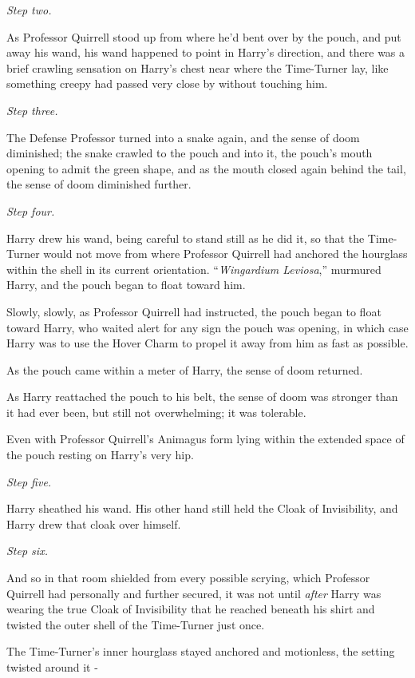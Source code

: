 \emph{Step two.}

As Professor Quirrell stood up from where he'd bent over by the pouch, and put away his wand, his wand happened to point in Harry's direction, and there was a brief crawling sensation on Harry's chest near where the Time-Turner lay, like something creepy had passed very close by without touching him.

\emph{Step three.}

The Defense Professor turned into a snake again, and the sense of doom diminished; the snake crawled to the pouch and into it, the pouch's mouth opening to admit the green shape, and as the mouth closed again behind the tail, the sense of doom diminished further.

\emph{Step four.}

Harry drew his wand, being careful to stand still as he did it, so that the Time-Turner would not move from where Professor Quirrell had anchored the hourglass within the shell in its current orientation. ``\emph{Wingardium Leviosa},'' murmured Harry, and the pouch began to float toward him.

Slowly, slowly, as Professor Quirrell had instructed, the pouch began to float toward Harry, who waited alert for any sign the pouch was opening, in which case Harry was to use the Hover Charm to propel it away from him as fast as possible.

As the pouch came within a meter of Harry, the sense of doom returned.

As Harry reattached the pouch to his belt, the sense of doom was stronger than it had ever been, but still not overwhelming; it was tolerable.

Even with Professor Quirrell's Animagus form lying within the extended space of the pouch resting on Harry's very hip.

\emph{Step five.}

Harry sheathed his wand. His other hand still held the Cloak of Invisibility, and Harry drew that cloak over himself.

\emph{Step six.}

And so in that room shielded from every possible scrying, which Professor Quirrell had personally and further secured, it was not until \emph{after} Harry was wearing the true Cloak of Invisibility that he reached beneath his shirt and twisted the outer shell of the Time-Turner just once.

The Time-Turner's inner hourglass stayed anchored and motionless, the setting twisted around it -

